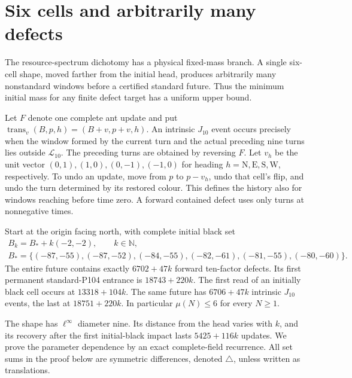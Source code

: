 \section{Six cells and arbitrarily many defects}\label{sec:six}
The resource-spectrum dichotomy has a physical fixed-mass branch. A single
six-cell shape, moved farther from the initial head, produces arbitrarily many
nonstandard windows before a certified standard future. Thus the minimum
initial mass for any finite defect target has a uniform upper bound.

Let $F$ denote one complete ant update and put
$\operatorname{trans}_v(B,p,h)=(B+v,p+v,h)$.
An intrinsic $J_{10}$ event occurs precisely when the window formed by the
current turn and the actual preceding nine turns lies outside $\mathcal L_{10}$.
The preceding turns are obtained by reversing $F$. Let $v_h$ be the unit vector
$(0,1),(1,0),(0,-1),( -1,0)$ for heading $h=\mathrm N,\mathrm E,\mathrm S,\mathrm W$,
respectively. To undo an update, move from
$p$ to $p-v_h$, undo that cell's flip, and undo the turn determined by its
restored colour. This defines the history also for windows reaching before
time zero. A forward contained defect uses only turns at nonnegative times.

\begin{theorem}\label{thm:six}
Start at the origin facing north, with complete initial black set
\begin{gather*}
 B_k=B_*+k(-2,-2),\qquad k\in\mathbb N,\\
 B_*=\{(-87,-55),(-87,-52),(-84,-55),(-82,-61),(-81,-55),(-80,-60)\}.
\end{gather*}
The entire future contains exactly $6702+47k$ forward ten-factor defects.
Its first permanent standard-P104 entrance is $18743+220k$.
The first read of an initially black cell occurs at $13318+104k$.
The same future has $6706+47k$ intrinsic $J_{10}$ events, the last at
$18751+220k$. In particular $\mu(N)\le6$ for every $N\ge1$.
\end{theorem}

The shape has $\ell^\infty$ diameter nine. Its distance from the head varies
with $k$, and its recovery after the first initial-black impact lasts
$5425+116k$ updates. We prove the parameter dependence by an exact complete-field
recurrence. All set sums in the proof below are symmetric differences, denoted
$\triangle$, unless written as translations.

